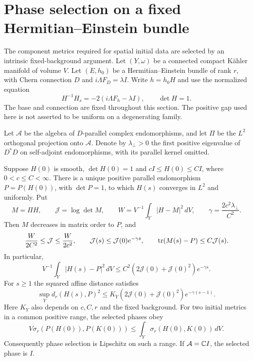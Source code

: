 \section{Phase selection on a fixed Hermitian--Einstein bundle}
\label{sec:parallel-phase}

The component metrics required for spatial initial data are selected by
an intrinsic fixed-background argument. Let $(Y,\omega)$ be a connected
compact K\"ahler manifold of volume $V$. Let $(E,h_0)$ be a
Hermitian--Einstein bundle of rank $r$, with Chern connection $D$ and
$i\Lambda F_D=\lambda I$. Write $h=h_0H$ and use the normalized equation
\begin{equation}\label{eq:fixed-flow}
 H^{-1}H_s=-2(i\Lambda F_h-\lambda I),\qquad \det H=1.
\end{equation}
The base and connection are fixed throughout this section. The positive
gap used here is not asserted to be uniform on a degenerating family.

Let $\mathcal A$ be the algebra of $D$-parallel complex endomorphisms,
and let $\Pi$ be the $L^2$ orthogonal projection onto $\mathcal A$.
Denote by $\lambda_\perp>0$ the first positive eigenvalue of $D^*D$
on self-adjoint endomorphisms, with its parallel kernel omitted.

\begin{theorem}\label{thm:parallel-phase}
Suppose $H(0)$ is smooth, $\det H(0)=1$ and $cI\le H(0)\le CI$,
where $0<c\le C<\infty$. There is a unique positive parallel
endomorphism $P=P(H(0))$, with $\det P=1$, to which $H(s)$ converges
in $L^2$ and uniformly. Put
\begin{equation}\label{eq:phase-functionals}
 M=\Pi H,\qquad \mathcal J=\log\det M,\qquad
 W=V^{-1}\int_Y|H-M|^2\,dV,\qquad
 \gamma=\frac{2c^2\lambda_\perp}{C^2}.
\end{equation}
Then $M$ decreases in matrix order to $P$, and
\begin{equation}\label{eq:phase-estimates}
 \frac{W}{2C^2}\le \mathcal J\le\frac{W}{2c^2},\qquad
 \mathcal J(s)\le \mathcal J(0)e^{-\gamma s},\qquad
 \operatorname{tr}(M(s)-P)\le C\mathcal J(s).
\end{equation}
In particular,
\begin{equation}\label{eq:phase-l2}
 V^{-1}\int_Y|H(s)-P|^2\,dV
       \le C^2(2\mathcal J(0)+\mathcal J(0)^2)e^{-\gamma s}.
\end{equation}
For $s\ge1$ the squared affine distance satisfies
\begin{equation}\label{eq:phase-uniform}
 \sup_Y d_r(H(s),P)^2
       \le K_Y(2\mathcal J(0)+\mathcal J(0)^2)e^{-\gamma(s-1)}.
\end{equation}
Here $K_Y$ also depends on $c,C,r$ and the fixed background. For two
initial metrics in a common positive range, the selected phases obey
\begin{equation}\label{eq:phase-contraction}
 V\sigma_r(P(H(0)),P(K(0)))
       \le\int_Y\sigma_r(H(0),K(0))\,dV.
\end{equation}
Consequently phase selection is Lipschitz on such a range. If
$\mathcal A=\mathbb C I$, the selected phase is $I$.
\end{theorem}

